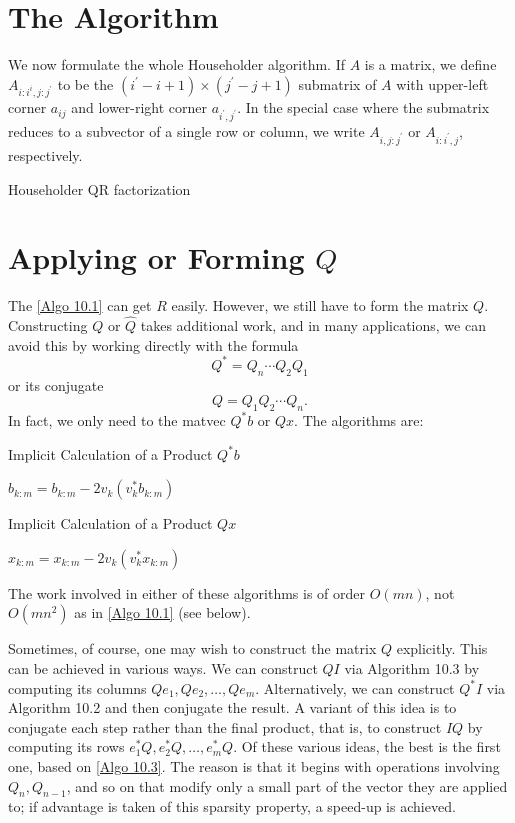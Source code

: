 \section{The Algorithm} 
We now formulate the whole Householder algorithm. If $A$ is a matrix, we define $A_{i: i^i, j: j^{\prime}}$ to be the $\left(i^{\prime}-i+1\right) \times\left(j^{\prime}-j+1\right)$ submatrix of $A$ with upper-left corner $a_{i j}$ and lower-right corner $a_{i^{\prime}, j^{\prime}}$. In the special case where the submatrix reduces to a subvector of a single row or column, we write $A_{i, j: j^{\prime}}$ or $A_{i: i^{\prime}, j}$, respectively.

\begin{algorithm}[H]
    \caption{Householder QR factorization}
    \label{Algo 10.1}
\end{algorithm}

\section{Applying or Forming $Q$} 
The \autoref{Algo 10.1} can get $R$ easily.  However, we still have to form the matrix $Q$. Constructing $Q$ or $\hat{Q}$ takes additional work, and in many applications, we can avoid this by working directly with the formula
$$
Q^*=Q_n \cdots Q_2 Q_1
$$
or its conjugate
$$
Q=Q_1 Q_2 \cdots Q_n. 
$$ 
In fact, we only need to the matvec $Q^*b$ or $Qx$. The algorithms are:

\begin{algorithm}[H]
    \caption{Implicit Calculation of a Product $Q^*b$}
    \label{Algo 10.2}
     {
        $b_{k: m}=b_{k: m}-2 v_k\left(v_k^* b_{k: m}\right)$
    }
\end{algorithm}

\begin{algorithm}[H]
    \caption{Implicit Calculation of a Product $Qx$}
    \label{Algo 10.3}
     {
        $x_{k: m}=x_{k: m}-2 v_k\left(v_k^* x_{k: m}\right)$
    }
\end{algorithm}
The work involved in either of these algorithms is of order $O(m n)$, not $O\left(m n^2\right)$ as in \autoref{Algo 10.1} (see below).

Sometimes, of course, one may wish to construct the matrix $Q$ explicitly. This can be achieved in various ways. We can construct $Q I$ via Algorithm 10.3 by computing its columns $Q e_1, Q e_2, \ldots, Q e_m$. Alternatively, we can construct $Q^* I$ via Algorithm 10.2 and then conjugate the result. A variant of this idea is to conjugate each step rather than the final product, that is, to construct $I Q$ by computing its rows $e_1^* Q, e_2^* Q, \ldots, e_m^* Q$. Of these various ideas, the best is the first one, based on \autoref{Algo 10.3}. The reason is that it begins with operations involving $Q_n, Q_{n-1}$, and so on that modify only a small part of the vector they are applied to; if advantage is taken of this sparsity property, a speed-up is achieved.

